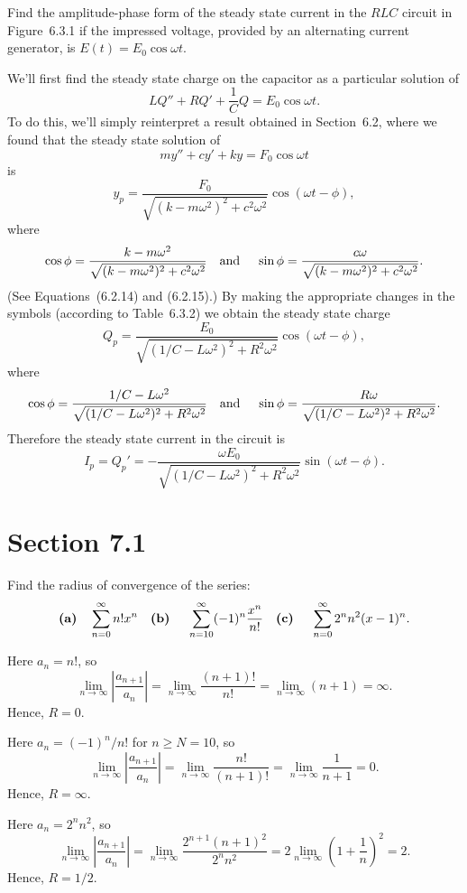 \setcounter{example}{1}
\begin{example}
  \label{example:6.3.2} \rm Find the amplitude-phase form of the steady state current in the $RLC$
  circuit in Figure~6.3.1 if the impressed voltage, provided by an alternating current
  generator, is $E(t)=E_{0}\cos\omega t$.
\end{example}
\begin{examplesolution}
\solution We'll first find the steady state charge on the capacitor as a particular solution of
\[
  LQ''+RQ'+\frac{1}{C}Q=E_{0}\cos\omega t.
\]
To do this, we'll simply reinterpret a result obtained in Section~6.2, where we found that the
steady state solution of
\[
  my''+cy'+ky=F_{0}\cos\omega t
\]
is
\[
  y_{p}=\frac{F_{0}}{\sqrt{(k-m\omega^{2})^{2}+c^{2}\omega^{2}}}\cos(\omega t-\phi),
\]
where
\[
  \cos\phi=\frac{k-m\omega^{2}}{\sqrt{(k-m\omega^{2})^{2}+c^{2}\omega^{2}}}\mbox{\quad and \quad}\sin\phi=\frac{c\omega}{\sqrt{(k-m\omega^{2})^{2}+c^{2}\omega^{2}}}.
\]
(See Equations~\textup{(6.2.14)} and \textup{(6.2.15)}.) By making the appropriate changes in the
symbols (according to Table~6.3.2) we obtain the steady state charge
\[
  Q_{p}=\frac{E_{0}}{\sqrt{(1/C-L\omega^{2})^{2}+R^{2}\omega^{2}}}\cos(\omega t-\phi),
\]
where
\[
  \cos\phi=\frac{1/C-L\omega^{2}}{\sqrt{(1/C-L\omega^{2})^{2}+R^{2}\omega^{2}}}\mbox{\quad and \quad}\sin\phi=\frac{R\omega}{\sqrt{(1/C-L\omega^{2})^{2}+R^{2}\omega^{2}}}.
\]
Therefore the steady state current in the circuit is
\[
  I_{p}=Q_{p}'= -\frac{\omega E_{0}}{\sqrt{(1/C-L\omega^{2})^{2}+R^{2}\omega^{2}}}\sin(\omega t-\phi).
\]
\end{examplesolution}

\section*{Section 7.1}
{}
\setcounter{chapter}{7}
\setcounter{section}{1}

\setcounter{example}{0}
\begin{example}
  \label{example:7.1.1} \rm Find the radius of convergence of the series:
  \[
    \mbox{\bf (a)}\quad\sum_{n=0}^{\infty}n!x^{n}\quad\mbox{\bf (b) }\quad \sum_{n=10}^{\infty}(-1)^{n}\frac{x^{n}}{n!}\quad\mbox{\bf (c) }\quad \sum_{n=0}^{\infty}2^{n}n^{2}(x-1)^{n}.
  \]
\end{example}
\begin{examplesolution}
 Here $a_{n}=n!$, so
\[
  \lim_{n\to\infty}\left|\frac{a_{n+1}}{a_{n}}\right|=\lim_{n\to\infty}\frac{(n+1)!}{n!}=\lim_{n\to\infty}(n+1)=\infty.
\]
Hence, $R=0$.

 Here $a_{n}=(-1)^{n}/n!$ for $n\ge N=10$, so
\[
  \lim_{n\to\infty}\left|\frac{a_{n+1}}{a_{n}}\right|=\lim_{n\to\infty}\frac{n!}{(n+1)!}=\lim_{n\to\infty}\frac{1}{n+1}=0.
\]
Hence, $R=\infty$.

 Here $a_{n}=2^{n}n^{2}$, so
\[
  \lim_{n\to\infty}\left|\frac{a_{n+1}}{a_{n}}\right|=\lim_{n\to\infty}\frac{2^{n+1}(n+1)^{2}}{2^{n}n^{2}}=2\lim_{n\to\infty}\left(1+\frac{1}{n}\right)^{2}=2.
\]
Hence, $R=1/2$.
\end{examplesolution}

